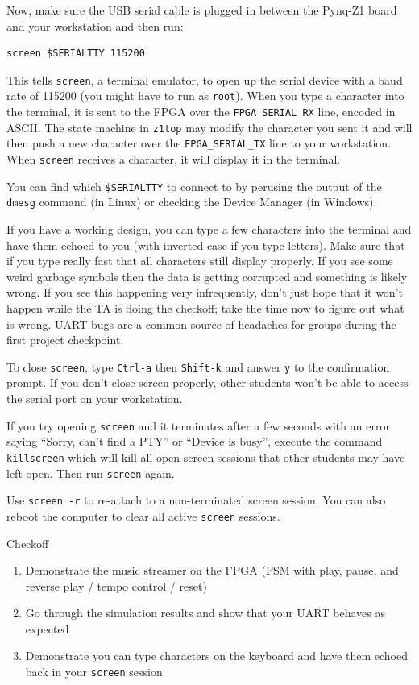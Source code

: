 \documentclass[11pt]{article}
\makeatletter
\renewcommand{\section}
{\@startsection {section}{1}{0pt}
 {-2ex}
 {1ex}
 {\bfseries\Large}}
\makeatother
\begin{document}
Now, make sure the USB serial cable is plugged in between the Pynq-Z1 board and your workstation and then run:

\begin{verbatim}
screen $SERIALTTY 115200
\end{verbatim}

This tells \verb|screen|, a terminal emulator, to open up the serial device with a baud rate of 115200 (you might have to run as \verb|root|).
When you type a character into the terminal, it is sent to the FPGA over the \verb|FPGA_SERIAL_RX| line, encoded in ASCII.
The state machine in \verb|z1top| may modify the character you sent it and will then push a new character over the \verb|FPGA_SERIAL_TX| line to your workstation.
When \verb|screen| receives a character, it will display it in the terminal.

You can find which \verb|$SERIALTTY| to connect to by perusing the output of the \verb|dmesg| command (in Linux) or checking the Device Manager (in Windows).

If you have a working design, you can type a few characters into the terminal and have them echoed to you (with inverted case if you type letters).
Make sure that if you type really fast that all characters still display properly.
If you see some weird garbage symbols then the data is getting corrupted and something is likely wrong.
If you see this happening very infrequently, don't just hope that it won't happen while the TA is doing the checkoff; take the time now to figure out what is wrong.
UART bugs are a common source of headaches for groups during the first project checkpoint.

To close \verb|screen|, type \verb|Ctrl-a| then \verb|Shift-k| and answer \verb|y| to the confirmation prompt.
If you don't close screen properly, other students won't be able to access the serial port on your workstation.

If you try opening \verb|screen| and it terminates after a few seconds with an error saying ``Sorry, can't find a PTY'' or ``Device is busy'', execute the command \verb|killscreen| which will kill all open screen sessions that other students may have left open.
Then run \verb|screen| again.

Use \verb|screen -r| to re-attach to a non-terminated screen session. You can also reboot the computer to clear all active \verb|screen| sessions.

\section{Checkoff}
\begin{enumerate}
    \item Demonstrate the music streamer on the FPGA (FSM with play, pause, and reverse play / tempo control / reset)
    \item Go through the simulation results and show that your UART behaves as expected
    \item Demonstrate you can type characters on the keyboard and have them echoed back in your \verb|screen| session
\end{enumerate}
\end{document}
